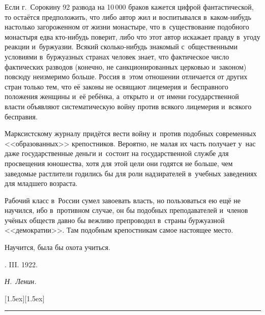 Если г.~Сорокину 92 развода на 10\,000 браков кажется
цифрой фантастической, то остаётся предположить, что либо автор жил и
воспитывался в~каком-нибудь настолько загороженном от жизни монастыре, что
в~существование подобного монастыря едва кто-нибудь поверит, либо что этот
автор искажает правду в~угоду реакции и~буржуазии. Всякий сколько-нибудь
знакомый с~общественными условиями в~буржуазных странах человек знает, что
фактическое число фактических разводов (конечно, не санкционированных
церковью и~законом) повсюду неизмеримо больше. Россия в~этом отношении
отличается от других стран только тем, что её законы не освящают лицемерия
и~бесправного положения женщины и~её ребёнка, а~открыто и~от имени
государственной власти объявляют систематическую войну против всякого
лицемерия и~всякого бесправия.

Марксистскому журналу придётся вести войну и~против подобных современных
<<образованных>> крепостников. Вероятно, не малая их часть получает у~нас даже
государственные деньги и~состоит на государственной службе для просвещения
юношества, хотя для этой цели они годятся не больше, чем заведомые
растлители годились бы для роли надзирателей в~учебных заведениях для
младшего возраста.

Рабочий класс в~России сумел завоевать власть, но пользоваться ею ещё не
научился, ибо в~противном случае, он бы подобных преподавателей и~членов
учёных обществ давно бы вежливо препроводил в~страны буржуазной
<<демократии>>. Там подобным крепостникам самое настоящее место.

\nopagebreak
Научится, была бы охота учиться.

\nopagebreak \medskip
{}. III. 1922.
\nopagebreak \medskip

{\raggedleft \textit{Н.~Ленин.} \par}

\nopagebreak \medskip
{\centering \raisebox{0}[1.5ex][1.5ex]{\rule{1.8cm}{0.4pt}} \par}

\bigskip
